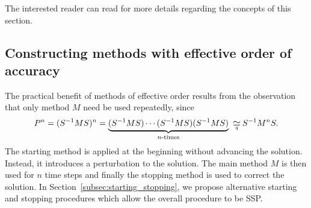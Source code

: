The interested reader can read \cite{Butcher2008_book} for more details regarding 
the concepts of this section.

\subsection{Constructing methods with effective order of accuracy}\label{subsec:RK_effective_order}
The practical benefit of methods of effective order results from the
observation that only method $M$ need be used repeatedly, since
\begin{displaymath}
	P^n = (S^{-1}MS)^n = \underbrace{(S^{-1}MS) \cdots (S^{-1}MS) (S^{-1}MS)}_{n\text{-times}} \equival{q} S^{-1} M^n S.
\end{displaymath}
The starting method is applied at the beginning without advancing the
solution.
Instead, it introduces a perturbation to the solution.
The main method  $M$ is then used for $n$ time steps and finally the
stopping method is used to correct the solution.
In Section~\ref{subsec:starting_stopping}, we propose alternative
starting and stopping procedures which allow the overall procedure to
be SSP.


